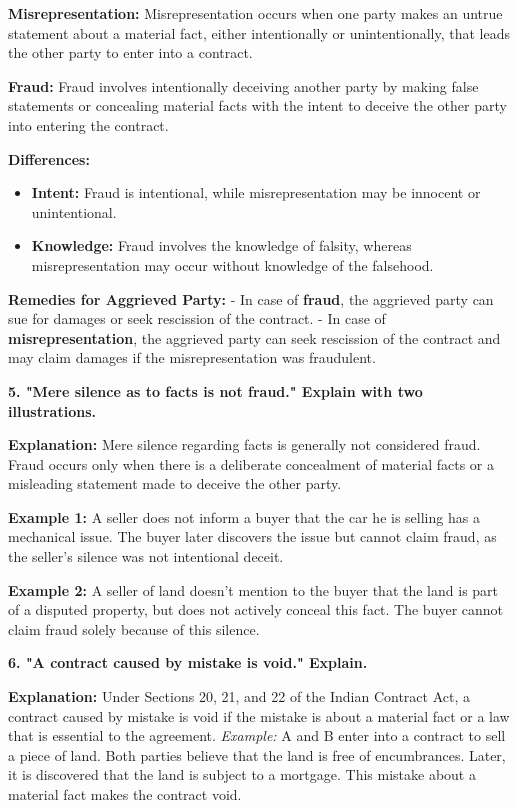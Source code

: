 \documentclass[12pt,a4paper]{book}
\begin{document}
\textbf{Misrepresentation:}  
Misrepresentation occurs when one party makes an untrue statement about a material fact, either intentionally or unintentionally, that leads the other party to enter into a contract.

\textbf{Fraud:}  
Fraud involves intentionally deceiving another party by making false statements or concealing material facts with the intent to deceive the other party into entering the contract.

\textbf{Differences:}  
\begin{itemize}
    \item \textbf{Intent:} Fraud is intentional, while misrepresentation may be innocent or unintentional.
    \item \textbf{Knowledge:} Fraud involves the knowledge of falsity, whereas misrepresentation may occur without knowledge of the falsehood.
\end{itemize}

\textbf{Remedies for Aggrieved Party:}  
- In case of \textbf{fraud}, the aggrieved party can sue for damages or seek rescission of the contract.
- In case of \textbf{misrepresentation}, the aggrieved party can seek rescission of the contract and may claim damages if the misrepresentation was fraudulent.

\vspace{0.5cm}
\textbf{5. "Mere silence as to facts is not fraud." Explain with two illustrations.}  

\textbf{Explanation:}  
Mere silence regarding facts is generally not considered fraud. Fraud occurs only when there is a deliberate concealment of material facts or a misleading statement made to deceive the other party.

\textbf{Example 1:}  
A seller does not inform a buyer that the car he is selling has a mechanical issue. The buyer later discovers the issue but cannot claim fraud, as the seller’s silence was not intentional deceit.

\textbf{Example 2:}  
A seller of land doesn’t mention to the buyer that the land is part of a disputed property, but does not actively conceal this fact. The buyer cannot claim fraud solely because of this silence.

\vspace{1cm}

\textbf{6. "A contract caused by mistake is void." Explain.}

\textbf{Explanation:}  
Under Sections 20, 21, and 22 of the Indian Contract Act, a contract caused by mistake is void if the mistake is about a material fact or a law that is essential to the agreement.  
\textit{Example:}  
A and B enter into a contract to sell a piece of land. Both parties believe that the land is free of encumbrances. Later, it is discovered that the land is subject to a mortgage. This mistake about a material fact makes the contract void.
\end{document}
